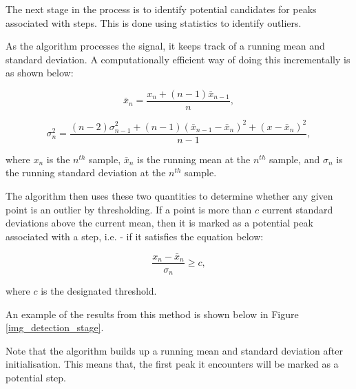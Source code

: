            The next stage in the process is to identify potential candidates for peaks associated with steps. This is done using statistics to identify outliers. 

            As the algorithm processes the signal, it keeps track of a running mean and standard deviation. A computationally efficient way of doing this incrementally is as shown below:

            \begin{equation}
                \bar{x}_n = \frac{x_n + (n-1)\bar{x}_{n-1}}{n},
            \end{equation}

            \begin{equation}
                \sigma_n^2 = \frac
                {(n-2)\sigma_{n-1}^2 + (n-1)(\bar{x}_{n-1} -\bar{x}_n)^2 + (x - \bar{x}_n)^2}
                {n-1},
            \end{equation}

            where $x_n$ is the $n^{th}$ sample, $\bar{x}_n$ is the running mean at the $n^{th}$ sample, and $\sigma_n$ is the running standard deviation at the $n^{th}$ sample.

            The algorithm then uses these two quantities to determine whether any given point is an outlier by thresholding. If a point is more than $c$ current standard deviations above the current mean, then it is marked as a potential peak associated with a step, i.e. - if it satisfies the equation below:

            \begin{equation}
                \frac{x_n - \bar{x}_n}{\sigma_n}\geq c,
            \end{equation}

            where $c$ is the designated threshold.

            An example of the results from this method is shown below in Figure \ref{img_detection_stage}.

            Note that the algorithm builds up a running mean and standard deviation after initialisation. This means that, the first peak it encounters will be marked as a potential step.

